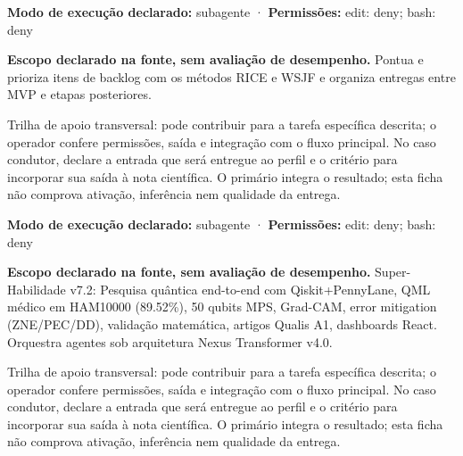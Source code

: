 \begin{arquitetura}
\textbf{Modo de execução declarado:} subagente · \textbf{Permissões:} edit: deny; bash: deny
\end{arquitetura}


\begin{descricao}
\textbf{Escopo declarado na fonte, sem avaliação de desempenho.}
Pontua e prioriza itens de backlog com os métodos RICE e WSJF e organiza entregas entre MVP e etapas posteriores.
\end{descricao}

\begin{funcao}
Trilha de apoio transversal: pode contribuir para a tarefa específica descrita; o operador confere permissões, saída e integração com o fluxo principal. No caso condutor, declare a entrada que será entregue ao perfil e o critério para incorporar sua saída à nota científica. O primário integra o resultado; esta ficha não comprova ativação, inferência nem qualidade da entrega.
\end{funcao}

\begin{arquitetura}
\textbf{Modo de execução declarado:} subagente · \textbf{Permissões:} edit: deny; bash: deny
\end{arquitetura}


\begin{descricao}
\textbf{Escopo declarado na fonte, sem avaliação de desempenho.}
Super-Habilidade v7.2: Pesquisa quântica end-to-end com Qiskit+PennyLane, QML médico em HAM10000 (89.52\%), 50 qubits MPS, Grad-CAM, error mitigation (ZNE/PEC/DD), validação matemática, artigos Qualis A1, dashboards React. Orquestra agentes sob arquitetura Nexus Transformer v4.0.
\end{descricao}

\begin{funcao}
Trilha de apoio transversal: pode contribuir para a tarefa específica descrita; o operador confere permissões, saída e integração com o fluxo principal. No caso condutor, declare a entrada que será entregue ao perfil e o critério para incorporar sua saída à nota científica. O primário integra o resultado; esta ficha não comprova ativação, inferência nem qualidade da entrega.
\end{funcao}

